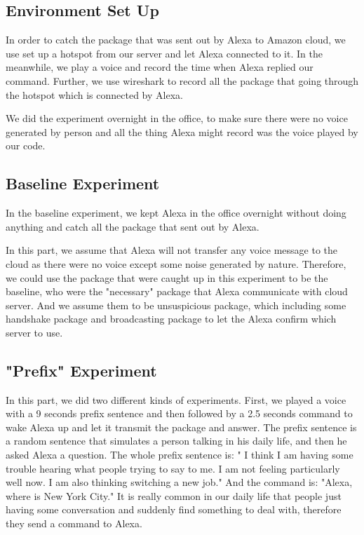 \subsection{Environment Set Up}

In order to catch the package that was sent out by Alexa to Amazon cloud, we use set up a hotspot from our server and let Alexa connected to it. In the meanwhile, we play a voice and record the time when Alexa replied our command. Further, we use wireshark to record all the package that going through the hotspot which is connected by Alexa. 

We did the experiment overnight in the office, to make sure there were no voice generated by person and all the thing Alexa might record was the voice played by our code.

\subsection{Baseline Experiment}

In the baseline experiment, we kept Alexa in the office overnight without doing anything and catch all the package that sent out by Alexa.

In this part, we assume that Alexa will not transfer any voice message to the cloud as there were no voice except some noise generated by nature. Therefore, we could use the package that were caught up in this experiment to be the baseline, who were the "necessary" package that Alexa communicate with cloud server. And we assume them to be unsuspicious package, which including some handshake package and broadcasting package to let the Alexa confirm which server to use.

\subsection{"Prefix" Experiment}

In this part, we did two different kinds of experiments. First, we played a voice with a 9 seconds prefix sentence and then followed by a 2.5 seconds command to wake Alexa up and let it transmit the package and answer. The prefix sentence is a random sentence that simulates a person talking in his daily life, and then he asked Alexa a question. The whole prefix sentence is: " I think I am having some trouble hearing what people trying to say to me. I am not feeling particularly well now. I am also thinking switching a new job." And the command is: "Alexa, where is New York City." It is really common in our daily life that people just having some conversation and suddenly find something to deal with, therefore they send a command to Alexa.

